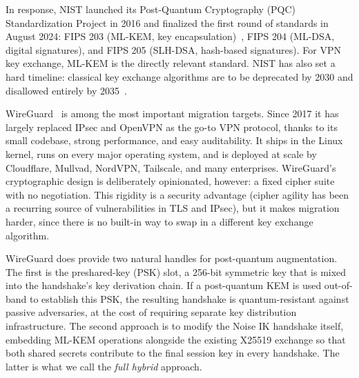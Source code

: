 \documentclass[11pt,a4paper]{article}
\begin{document}
In response, NIST launched its Post-Quantum Cryptography (PQC) Standardization Project in 2016 and finalized the first round of standards in August 2024: FIPS 203 (ML-KEM, key encapsulation)~\cite{fips203}, FIPS 204 (ML-DSA, digital signatures), and FIPS 205 (SLH-DSA, hash-based signatures). For VPN key exchange, ML-KEM is the directly relevant standard. NIST has also set a hard timeline: classical key exchange algorithms are to be deprecated by 2030 and disallowed entirely by 2035~\cite{nistir8547}.

WireGuard~\cite{donenfeld2017wireguard} is among the most important migration targets. Since 2017 it has largely replaced IPsec and OpenVPN as the go-to VPN protocol, thanks to its small codebase, strong performance, and easy auditability. It ships in the Linux kernel, runs on every major operating system, and is deployed at scale by Cloudflare, Mullvad, NordVPN, Tailscale, and many enterprises. WireGuard's cryptographic design is deliberately opinionated, however: a fixed cipher suite with no negotiation. This rigidity is a security advantage (cipher agility has been a recurring source of vulnerabilities in TLS and IPsec), but it makes migration harder, since there is no built-in way to swap in a different key exchange algorithm.

WireGuard does provide two natural handles for post-quantum augmentation. The first is the preshared-key (PSK) slot, a 256-bit symmetric key that is mixed into the handshake's key derivation chain. If a post-quantum KEM is used out-of-band to establish this PSK, the resulting handshake is quantum-resistant against passive adversaries, at the cost of requiring separate key distribution infrastructure. The second approach is to modify the Noise IK handshake itself, embedding ML-KEM operations alongside the existing X25519 exchange so that both shared secrets contribute to the final session key in every handshake. The latter is what we call the \emph{full hybrid} approach.
\end{document}
